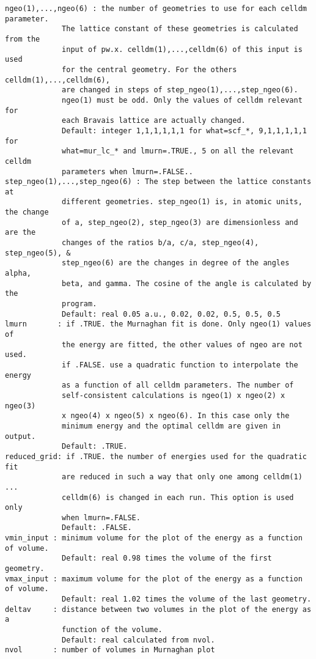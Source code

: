 \documentclass[12pt,a4paper]{article}
\begin{document}
\begin{verbatim}
ngeo(1),...,ngeo(6) : the number of geometries to use for each celldm parameter.
             The lattice constant of these geometries is calculated from the
             input of pw.x. celldm(1),...,celldm(6) of this input is used 
             for the central geometry. For the others celldm(1),...,celldm(6),
             are changed in steps of step_ngeo(1),...,step_ngeo(6). 
             ngeo(1) must be odd. Only the values of celldm relevant for
             each Bravais lattice are actually changed.
             Default: integer 1,1,1,1,1,1 for what=scf_*, 9,1,1,1,1,1 for 
             what=mur_lc_* and lmurn=.TRUE., 5 on all the relevant celldm 
             parameters when lmurn=.FALSE..
step_ngeo(1),...,step_ngeo(6) : The step between the lattice constants at 
             different geometries. step_ngeo(1) is, in atomic units, the change
             of a, step_ngeo(2), step_ngeo(3) are dimensionless and are the
             changes of the ratios b/a, c/a, step_ngeo(4), step_ngeo(5), &
             step_ngeo(6) are the changes in degree of the angles alpha,
             beta, and gamma. The cosine of the angle is calculated by the
             program.
             Default: real 0.05 a.u., 0.02, 0.02, 0.5, 0.5, 0.5
lmurn       : if .TRUE. the Murnaghan fit is done. Only ngeo(1) values of
             the energy are fitted, the other values of ngeo are not used. 
             if .FALSE. use a quadratic function to interpolate the energy 
             as a function of all celldm parameters. The number of 
             self-consistent calculations is ngeo(1) x ngeo(2) x ngeo(3)
             x ngeo(4) x ngeo(5) x ngeo(6). In this case only the 
             minimum energy and the optimal celldm are given in output. 
             Default: .TRUE. 
reduced_grid: if .TRUE. the number of energies used for the quadratic fit 
             are reduced in such a way that only one among celldm(1) ... 
             celldm(6) is changed in each run. This option is used only 
             when lmurn=.FALSE.
             Default: .FALSE.
vmin_input : minimum volume for the plot of the energy as a function of volume.
             Default: real 0.98 times the volume of the first geometry.
vmax_input : maximum volume for the plot of the energy as a function of volume.
             Default: real 1.02 times the volume of the last geometry.
deltav     : distance between two volumes in the plot of the energy as a 
             function of the volume.
             Default: real calculated from nvol.
nvol       : number of volumes in Murnaghan plot

\end{verbatim}
\end{document}
